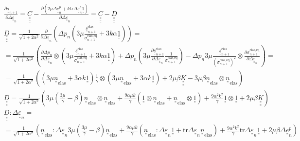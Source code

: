 \documentclass[12pt]{article}
\newcommand\ul[1]{\underline{#1}}
\newcommand\uus{\ul{\ul{s}}}
\newcommand\uue{\ul{\ul{e}}}
\newcommand\uuUnit{\ul{\ul{1}}}
\newcommand\uueps{\ul{\ul{\varepsilon}}}
\newcommand{\uuuuK}{\ul{\ul{\ul{\ul{K}}}}}
\newcommand{\uuuuC}{\ul{\ul{\ul{\ul{C}}}}}
\newcommand{\uuuuD}{\ul{\ul{\ul{\ul{D}}}}}
\newcommand\Deltaepsp{\Delta \uueps_{n}^p}
\newcommand\Deltaeps{\Delta \uueps_{n}}
\newcommand\Deltaep{\Delta \uue_{n}^p}
\newcommand\sigmaeqnelas{\sigma_{n+1}^\text{elas,eq}}
\newcommand\uusnelas{\uus_{n+1}^\text{elas}}
\newcommand\uusigman{\ul{\ul{\sigma}}_{n+1}}
\newcommand{\uunelas}{\ul{\ul{n}}_\text{elas}}
\newcommand\mtr{\mathrm{tr}}
\begin{document}
\begin{align}
    & \frac{\partial\uusigman}{\partial \Deltaeps} = \uuuuC - \frac{\partial (2\mu\Deltaep + k\mtr\Deltaepsp\uuUnit)}{\partial\Deltaeps} = \uuuuC - \uuuuD \\
    & \uuuuD = \frac{1}{\sqrt{1 + 2\alpha^2}} \frac{\partial }{\partial \Deltaeps} \left( \Delta p_n \left( 3\mu \frac{\uusnelas}{\sigmaeqnelas} + 3k\alpha \uuUnit  \right) \right) = \\
    & = \frac{1}{\sqrt{1 + 2\alpha^2}}\left( \frac{\partial\Delta p_n}{\partial\Deltaeps} \otimes \left( 3\mu\frac{\uusnelas}{\sigmaeqnelas} + 3k\alpha \uuUnit \right) + \Delta p_n \left(3\mu\frac{\partial\uusnelas}{\partial\Deltaeps}\frac{1}{\sigmaeqnelas} \right) - \Delta p_n 3\mu\frac{\uusnelas}{(\sigmaeqnelas)^2} \otimes \frac{\partial\sigmaeqnelas}{\partial\Deltaeps}\right) = \\
    & = \frac{1}{\sqrt{1 + 2\alpha^2}}\left( \left( 3\mu \uunelas + 3\alpha k \uuUnit \right) \frac{1}{\gamma} \otimes \left( 3\mu \uunelas + 3\alpha k \uuUnit \right) + 2\mu\beta\uuuuK - 3\mu\beta\uunelas \otimes \uunelas \right) \\
    & \uuuuD = \frac{1}{\sqrt{1 + 2\alpha^2}}\left( 3\mu\left(\frac{3\mu}{\gamma} - \beta\right)\uunelas \otimes \uunelas + \frac{9\alpha\mu k}{\gamma} (\uuUnit \otimes \uunelas + \uunelas \otimes \uuUnit) + \frac{9\alpha^2k^2}{\gamma} \uuUnit \otimes \uuUnit + 2\mu\beta \uuuuK \right) \\
    & \uuuuD : \Deltaeps = \\
    & = \frac{1}{\sqrt{1 + 2\alpha^2}}\left( \uunelas : \Deltaeps 3\mu \left( \frac{3\mu}{\gamma} - \beta \right) \uunelas + \frac{9\alpha\mu k}{\gamma} (\uunelas : \Deltaeps \uuUnit + \mtr\Deltaeps \uunelas) + \frac{9\alpha^2k^2}{\gamma} \mtr \Deltaeps \uuUnit + 2\mu\beta \Deltaep \right)  \\
\end{align}
\end{document}
